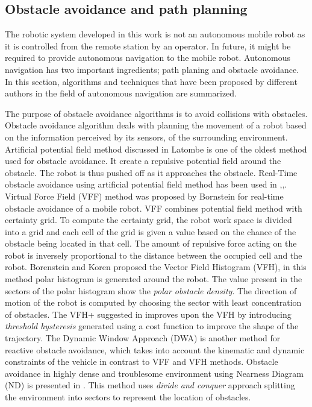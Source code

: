 \subsection{Obstacle avoidance and path planning}

The robotic system developed in this work is not an autonomous mobile robot as it is controlled from the remote station by an operator. In future, it might be required to provide autonomous navigation to the mobile robot. Autonomous navigation has two important  ingredients; path planing and obstacle avoidance. In this section, algorithms and techniques that have been proposed by different authors in the field of autonomous navigation are summarized. 

The purpose of obstacle avoidance algorithms is to avoid collisions with obstacles.  Obstacle avoidance algorithm deals with planning the movement of a robot based on the  information perceived by its sensors, of the surrounding environment. Artificial potential field method discussed in Latombe \cite{latombe2012robot} is one of the oldest method used for obstacle avoidance. It create a repulsive potential field around the obstacle. The robot is thus pushed off as it approaches the obstacle.  Real-Time obstacle avoidance  using artificial potential field method has been used in \cite{khatib1986real},\cite{tang2010novel},\cite{park2001obstacle}. Virtual Force Field (VFF) method was proposed by Bornstein \cite{borenstein1989real} for  real-time obstacle avoidance of a mobile robot. VFF combines potential field method \cite{latombe2012robot} with certainty grid. To compute the certainty grid,  the robot work space is divided into a grid and each cell of the  grid is given a value based on the chance of  the obstacle being  located in that cell. The amount of repulsive force acting on the robot is inversely proportional to the distance between the occupied cell and the robot. Borenstein and Koren \cite{borenstein1991vector} proposed  the Vector Field Histogram (VFH), in this method polar histogram is generated  around the robot. The value present in the sectors of the polar histogram show the \textit{polar obstacle density}. The direction of motion of the robot is computed by choosing the sector with least concentration of obstacles. The VFH+ suggested in \cite{ulrich1998vfh+} improves upon the VFH  by introducing  \textit{threshold hysteresis} generated using a cost function to improve the shape of the trajectory. The Dynamic Window Approach (DWA) \cite{brock1999high} is another method for reactive obstacle avoidance, which takes into account the kinematic and dynamic constraints of the vehicle in contrast to VFF and VFH methods. Obstacle avoidance in highly dense and troublesome environment using Nearness Diagram (ND) is presented in \cite{minguez2004nearness}. This method uses \textit{divide and conquer} approach splitting the environment into sectors to represent the location of obstacles. 

